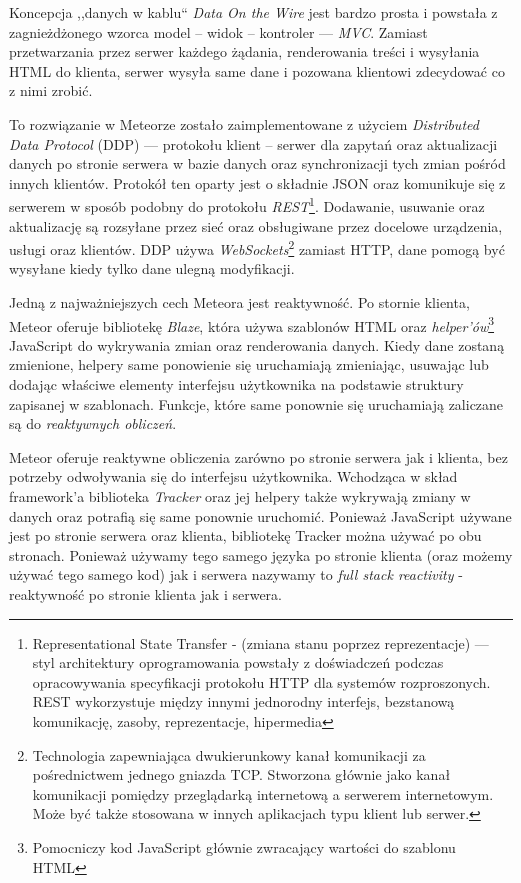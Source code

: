 Koncepcja ,,danych w kablu`` \emph{Data On the Wire} jest bardzo prosta i powstała z zagnieżdżonego wzorca model -- widok -- kontroler --- \textit{MVC}. Zamiast przetwarzania przez serwer każdego żądania, renderowania treści i wysyłania HTML do klienta, serwer wysyła same dane i pozowana klientowi zdecydować co z nimi zrobić\cite{strack15}.

To rozwiązanie w Meteorze zostało zaimplementowane z użyciem \emph{Distributed Data Protocol} (DDP) --- protokołu klient -- serwer dla zapytań oraz aktualizacji danych po stronie serwera w bazie danych oraz synchronizacji tych zmian pośród innych klientów. Protokół ten oparty jest o składnie JSON oraz komunikuje się z serwerem w sposób podobny do protokołu \emph{REST}\footnote{Representational State Transfer - (zmiana stanu poprzez reprezentacje) --- styl architektury oprogramowania powstały z doświadczeń podczas opracowywania specyfikacji protokołu HTTP dla systemów rozproszonych. REST wykorzystuje między innymi jednorodny interfejs, bezstanową komunikację, zasoby, reprezentacje, hipermedia\cite{restWiki}}. Dodawanie, usuwanie oraz aktualizację są rozsyłane przez sieć oraz obsługiwane przez docelowe urządzenia, usługi oraz klientów. DDP używa \emph{WebSockets}\footnote{Technologia zapewniająca dwukierunkowy kanał komunikacji za pośrednictwem jednego gniazda TCP. Stworzona głównie jako kanał komunikacji pomiędzy przeglądarką internetową a serwerem internetowym. Może być także stosowana w innych aplikacjach typu klient lub serwer.\cite{wsWiki}} zamiast HTTP, dane pomogą być wysyłane kiedy tylko dane ulegną modyfikacji\cite{strack15}.


Jedną z najważniejszych cech Meteora jest reaktywność. Po stornie klienta, Meteor oferuje bibliotekę \emph{Blaze}, która używa szablonów HTML oraz \emph{helper'ów}\footnote{Pomocniczy kod JavaScript głównie zwracający wartości do szablonu HTML} JavaScript do wykrywania zmian oraz renderowania danych. Kiedy dane zostaną zmienione, helpery same ponowienie się uruchamiają zmieniając, usuwając lub dodając właściwe elementy interfejsu użytkownika na podstawie struktury zapisanej w szablonach. Funkcje, które same ponownie się uruchamiają zaliczane są do \emph{reaktywnych obliczeń}\cite{strack15}.  

Meteor oferuje reaktywne obliczenia zarówno po stronie serwera jak i klienta, bez potrzeby odwoływania się do interfejsu użytkownika. Wchodząca w skład framework'a biblioteka \emph{Tracker} oraz jej helpery także wykrywają zmiany w danych oraz potrafią się same ponownie uruchomić. Ponieważ JavaScript używane jest po stronie serwera oraz klienta, bibliotekę Tracker można używać po obu stronach. Ponieważ używamy tego samego języka po stronie klienta (oraz możemy używać tego samego kod) jak i serwera nazywamy to \emph{full stack reactivity} - reaktywność po stronie klienta jak i serwera\cite{strack15}.

